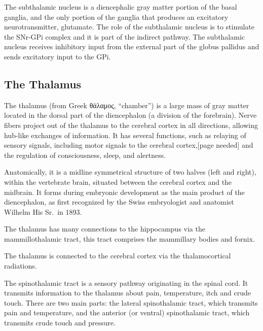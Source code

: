 The subthalamic nucleus is a diencephalic gray matter portion of the basal ganglia, and the only portion of the ganglia that produces an excitatory neurotransmitter, glutamate. The role of the subthalamic nucleus is to stimulate the SNr-GPi complex and it is part of the indirect pathway. The subthalamic nucleus receives inhibitory input from the external part of the globus pallidus and sends excitatory input to the GPi.

\hypertarget{the-thalamus}{%
\subsection{The Thalamus}\label{the-thalamus}}

The thalamus (from Greek θάλαμος, ``chamber'') is a large mass of gray matter located in the dorsal part of the diencephalon (a division of the forebrain). Nerve fibers project out of the thalamus to the cerebral cortex in all directions, allowing hub-like exchanges of information. It has several functions, such as relaying of sensory signals, including motor signals to the cerebral cortex,{[}page needed{]} and the regulation of consciousness, sleep, and alertness.

Anatomically, it is a midline symmetrical structure of two halves (left and right), within the vertebrate brain, situated between the cerebral cortex and the midbrain. It forms during embryonic development as the main product of the diencephalon, as first recognized by the Swiss embryologist and anatomist Wilhelm His Sr.~in 1893.

The thalamus has many connections to the hippocampus via the mammillothalamic tract, this tract comprises the mammillary bodies and fornix.

The thalamus is connected to the cerebral cortex via the thalamocortical radiations.

The spinothalamic tract is a sensory pathway originating in the spinal cord. It transmits information to the thalamus about pain, temperature, itch and crude touch. There are two main parts: the lateral spinothalamic tract, which transmits pain and temperature, and the anterior (or ventral) spinothalamic tract, which transmits crude touch and pressure.

